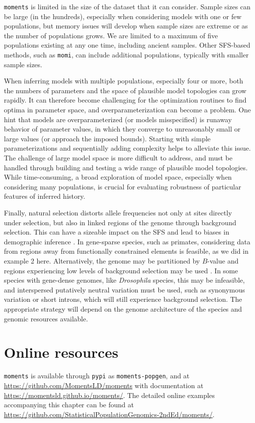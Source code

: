 \documentclass[]{article}
\newcommand{\moments}{\texttt{moments}\xspace}
\newcommand{\momi}{\texttt{momi}\xspace}
\begin{document}
\moments is limited in the size of the dataset that it can consider. Sample
sizes can be large (in the hundreds), especially when considering models with
one or few populations, but memory issues will develop when sample sizes are
extreme or as the number of populations grows. We are limited to a maximum of
five populations existing at any one time, including ancient samples. Other
SFS-based methods, such as \momi \citep{kamm2020efficiently, dilber2024faster},
can include additional populations, typically with smaller sample sizes.

When inferring models with multiple populations, especially four or more, both
the numbers of parameters and the space of plausible model topologies can grow
rapidly. It can therefore become challenging for the optimization routines to
find optima in parameter space, and overparameterization can become a problem.
One hint that models are overparameterized (or models misspecified) is runaway
behavior of parameter values, in which they converge to unreasonably small or
large values (or approach the imposed bounds). Starting with simple
parameterizations and sequentially adding complexity helps to alleviate this
issue. The challenge of large model space is more difficult to address, and
must be handled through building and testing a wide range of plausible model
topologies. While time-consuming, a broad exploration of model space,
especially when considering many populations, is crucial for evaluating
robustness of particular features of inferred history.

Finally, natural selection distorts allele frequencies not only at sites
directly under selection, but also in linked regions of the genome through
background selection. This can have a sizeable impact on the SFS and lead to
biases in demographic inference \citep{ewing2016consequences, johri2021impact}.
In gene-sparse species, such as primates, considering data from regions away
from functionally constrained elements is feasible, as we did in example 2
here.  Alternatively, the genome may be partitioned by $B$-value \citep[a
measure of the local strength of background
selectionk,][]{mcvicker2009widespread} and regions experiencing low levels of
background selection may be used \citep[for an example,
see][]{medina2023demographic}. In some species with gene-dense genomes, like
\emph{Drosophila} species, this may be infeasible, and interspersed putatively
neutral variation must be used, such as synonymous variation or short introns,
which will still experience background selection. The appropriate strategy will
depend on the genome architecture of the species and genomic resources
available.


\section*{Online resources} \moments is available through \texttt{pypi} as
\texttt{moments-popgen}, and at \url{https://github.com/MomentsLD/moments} with
documentation at \url{https://momentsld.github.io/moments/}. The detailed
online examples accompanying this chapter can be found at
\url{https://github.com/StatisticalPopulationGenomics-2ndEd/moments/}.



\end{document}
